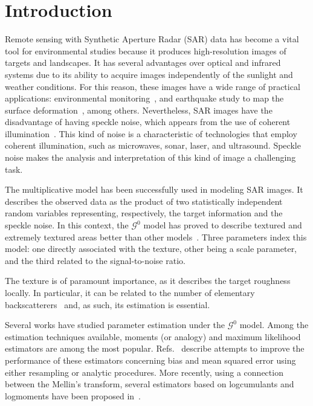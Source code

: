 \documentclass[twocolumn]{svjour3}
\begin{document}
	\section{Introduction}
	\label{intro}
	
	Remote sensing with Synthetic Aperture Radar (SAR) data has become a vital tool for environmental studies because it produces high-resolution images of targets and landscapes. 
	It has several advantages over optical and infrared systems due to its ability to acquire images independently of the sunlight and weather conditions. 
	For this reason, these images have a wide range of practical applications: environmental monitoring~\cite{White1991,Brisco2013}, and
	earthquake study to map the surface deformation~\cite{Yinghui2017}, among others.  
	Nevertheless, SAR images have the disadvantage of having speckle noise, which appears from the use of coherent illumination~\cite{SARImageStatisticalModelingPartISinglePixelStatisticalModels}. 
	This kind of noise is a characteristic of technologies that
	employ coherent illumination, such as microwaves, sonar, laser, and ultrasound. 
	Speckle noise makes the analysis and interpretation of this kind of image a challenging task.
	
	The multiplicative model has been successfully used in modeling SAR images.
	It describes the observed data as the product of two statistically independent random variables representing, respectively, the target information and the speckle noise. 
	In this context, the $\mathcal{G}^0$ model has proved to describe textured and extremely textured areas better than other models~\cite{Frery97,MejailJacoboFreryBustos:IJRS}. 
	Three parameters index this model: 
	one directly associated with the texture, 
	other being a scale parameter, 
	and the third related to the signal-to-noise ratio.
	
	The texture is of paramount importance, as it describes the target roughness locally.
	In particular, it can be related to the number of elementary backscatterers~\cite{AGeneralizedGaussianCoherentScattererModelforCorrelatedSARTexture} and, as such, its estimation is essential.
	
	Several works have studied parameter estimation under the $\mathcal{G}^0$ model. 
	Among the estimation techniques available, moments (or analogy) and maximum likelihood estimators are among the most popular. 
	Refs.~\cite{VasconcellosFrerySilva:CompStat,CribariFrerySilva:CSDA} describe attempts to improve the performance of these estimators concerning bias and mean squared error using either resampling or analytic procedures. More recently, using a connection between the Mellin's transform, several estimators based on logcumulants and logmoments have been proposed in~\cite{MellinAnalysisPolSAR,BujorTrouveValetNicolas2004,khan2014}. 
	
\end{document}
